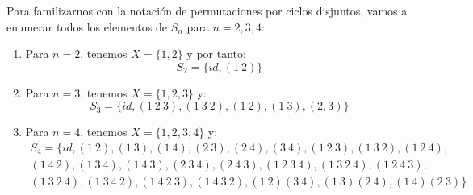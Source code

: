\begin{ejemplo}
    Para familizarnos con la notación de permutaciones por ciclos disjuntos, vamos a enumerar todos los elementos de $S_n$ para $n=2,3,4$:
    \begin{enumerate}
        \item Para $n=2$, tenemos $X=\{1,2\}$ y por tanto:
            \begin{equation*}
                S_2 = \{id, (1\ 2)\}
            \end{equation*}
        \item Para $n=3$, tenemos $X=\{1,2,3\}$ y:
            \begin{equation*}
                S_3 = \{id, (1\ 2\ 3), (1\ 3\ 2), (1\ 2), (1\ 3), (2, 3)\}
            \end{equation*}
        \item Para $n=4$, tenemos $X=\{1,2,3,4\}$ y:
            \begin{multline*}
                S_4 = \{id, (1\ 2), (1\ 3), (1\ 4), (2\ 3), (2\ 4), (3\ 4), (1\ 2\ 3), (1\ 3\ 2), (1\ 2\ 4), \\
                    (1\ 4\ 2), (1\ 3\ 4), (1\ 4\ 3), (2\ 3\ 4), (2\ 4\ 3), (1\ 2\ 3\ 4), (1\ 3\ 2\ 4), (1\ 2\ 4\ 3), \\
                (1\ 3\ 2\ 4), (1\ 3\ 4\ 2), (1\ 4\ 2\ 3), (1\ 4\ 3\ 2), (1\ 2)(3\ 4), (1\ 3)(2\ 4), (1\ 4)(2\ 3)\}
            \end{multline*}
    \end{enumerate}
\end{ejemplo}


